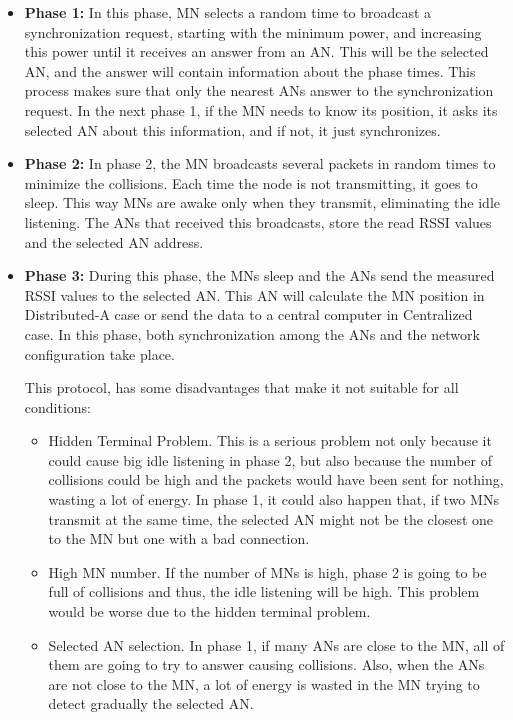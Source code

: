 \begin{itemize}
 \item \textbf{Phase 1:} In this phase, \ac{MN} selects a random time to broadcast a synchronization request, starting with the minimum power,
and increasing this power until it receives an answer from an \ac{AN}. This will be the selected \ac{AN}, and the answer will contain information
about the phase times. This process makes sure that only the nearest \acp{AN} answer to the synchronization request. In the next phase 1, if 
the \ac{MN} needs to know its position, it asks its selected \ac{AN} about this information, and if not, it just synchronizes.
 \item \textbf{Phase 2:} In phase 2, the \ac{MN} broadcasts several packets in random times to minimize the collisions. Each time the node is not
transmitting, it goes to sleep. This way \acp{MN} are awake only when they transmit, eliminating the idle listening. The \acp{AN} that
received this broadcasts, store the read \ac{RSSI} values and the selected \ac{AN} address.
 \item \textbf{Phase 3:} During this phase, the \acp{MN} sleep and the \acp{AN} send the measured \ac{RSSI} values to the selected \ac{AN}. 
This \ac{AN} will calculate the \ac{MN} position in Distributed-A case or send the data to a central computer in Centralized case. In this phase, both 
synchronization among the \acp{AN} and the network configuration take place.

This protocol, has some disadvantages that make it not suitable for all conditions:

\begin{itemize}
 \item Hidden Terminal Problem. This is a serious problem not only because it could cause big idle listening in phase 2, but also because the number
of collisions could be high and the packets would have been sent for nothing, wasting a lot of energy. In phase 1, it could also 
happen that, if two \acp{MN} transmit at the same time, the selected \ac{AN} might not be the closest one to the \ac{MN} but one with a bad connection.
 \item High \ac{MN} number. If the number of \acp{MN} is high, phase 2 is going to be full of collisions and thus, the idle listening will be
high. This problem would be worse due to the hidden terminal problem.
 \item Selected \ac{AN} selection. In phase 1, if many \acp{AN} are close to the \ac{MN}, all of them are going to try to answer causing collisions. Also, 
when the \acp{AN} are not close to the \ac{MN}, a lot of energy is wasted in the \ac{MN} trying to detect gradually the selected \ac{AN}.
\end{itemize}


\end{itemize}



